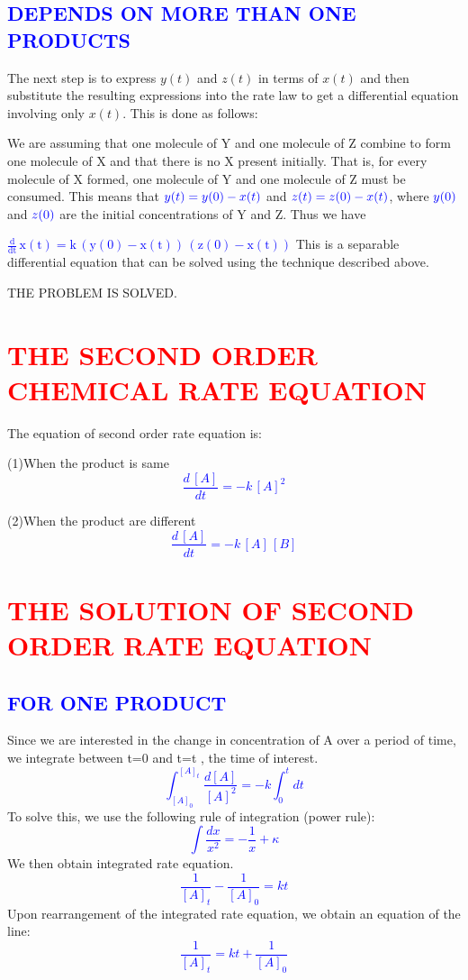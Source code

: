 \documentclass[12pt]{article}
\begin{document}
\subsection{\textcolor{blue}{DEPENDS ON MORE THAN ONE PRODUCTS }}
\textsf
The next step is to express $y(t)$ and $z(t)$ in terms of $x(t)$ and then substitute the resulting expressions into the rate law to get a differential equation involving only $x(t)$. This is done as follows:

       We are assuming that one molecule of Y and one molecule of Z combine to form one molecule of X and that there is no X present initially. That is, for every molecule of X formed, one molecule of Y and one molecule of Z must be consumed. This means that $\textcolor{blue}{y(t)=y(0)-x(t)}$ and $\textcolor{blue}{z(t)=z(0)-x(t)}$, where $\textcolor{blue}{y(0)}$ and $\textcolor{blue}{z(0)}$ are the initial concentrations of Y and Z. Thus we have 
       
     \textcolor{blue}{${\mathrm{\frac{d}{dt}\,x(t)=k\,(y(0)-x(t))\,(z(0)-x(t))}}$}
     This is a separable differential equation that can be solved using the technique described above.

THE PROBLEM IS SOLVED.

\newpage
\section{\textcolor{red}{THE SECOND ORDER CHEMICAL RATE EQUATION}}
\textsf
  		The equation of second order rate equation is:
  	
  		(1)When the product is same
  		\textcolor{blue}{$$\frac{d\,[A]}{dt}=-k\,{[A]}^2$$}
  		
  		(2)When the product are different
  		\textcolor{blue}{$$\frac{d\,[A]}{dt}=-k\,[A]\,[B]$$}
\section{\textcolor{red}{THE SOLUTION OF SECOND ORDER RATE EQUATION}}
\subsection{\textcolor{blue}{FOR ONE PRODUCT}}
\textsf
 		Since we are interested in the change in concentration of A over a period of time, we integrate between t=0 and  t=t , the time of interest.
 		\textcolor{blue}{$$\int_{{[A]}_0}^{{[A]_t}}\frac{d[A]}{{[A]}^2}=-k\int_{0}^{t}dt$$}
 		To solve this, we use the following rule of integration (power rule):
 		\textcolor{blue}{$$\int{\frac{dx}{x^2}}=-\frac{1}{x}+\kappa$$}
 		We then obtain integrated rate equation.
 		\textcolor{blue}{$$\frac{1}{{[A]}_t}-\frac{1}{{[A]}_0}=kt$$}
 		Upon rearrangement of the integrated rate equation, we obtain an equation of the line:
 		\textcolor{blue}{$$\frac{1}{{[A]}_t}=kt+\frac{1}{{[A]}_0}$$}
\newpage
\end{document}
